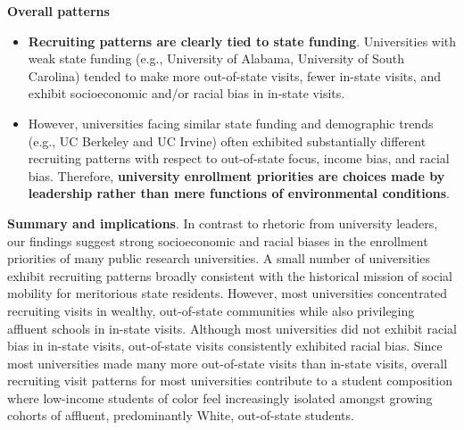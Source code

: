 \documentclass[twoside]{article}
\begin{document}
\begin{color-block}[Findings]
\textbf{Overall patterns}
\begin{itemize}
    \item \textbf{Recruiting patterns are clearly tied to state funding}. Universities with weak state funding (e.g., University of Alabama, University of South Carolina) tended to make more out-of-state visits, fewer in-state visits, and exhibit socioeconomic and/or racial bias in in-state visits. %
    \item However, universities facing similar state funding and demographic trends (e.g., UC Berkeley and UC Irvine) often exhibited substantially different recruiting patterns with respect to out-of-state focus, income bias, and racial bias. Therefore, \textbf{university enrollment priorities are choices made by leadership rather than mere functions of environmental conditions}. 
\end{itemize}  

\end{color-block}

\textbf{Summary and implications}. In contrast to rhetoric from university leaders, our findings suggest strong socioeconomic and racial biases in the enrollment priorities of many public research universities. A small number of universities exhibit recruiting patterns broadly consistent with the historical mission of social mobility for meritorious state residents. However, most universities concentrated recruiting visits in wealthy, out-of-state communities while also privileging affluent schools in in-state visits. Although most universities did not exhibit racial bias in in-state visits, out-of-state visits consistently exhibited racial bias. Since most universities made many more out-of-state visits than in-state visits, overall recruiting visit patterns for most universities contribute to a student composition where low-income students of color feel increasingly isolated amongst growing cohorts of affluent, predominantly White, out-of-state students.
\end{document}
